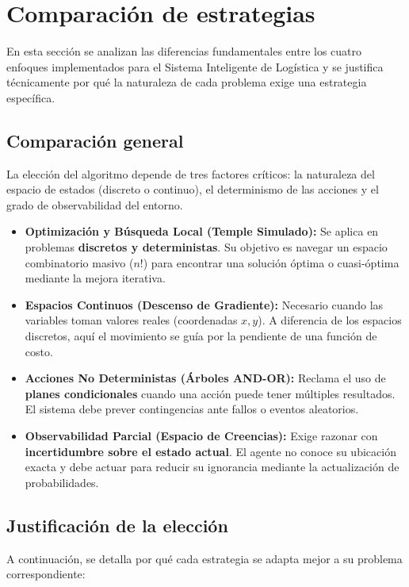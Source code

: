 \section{Comparación de estrategias}

En esta sección se analizan las diferencias fundamentales entre los cuatro enfoques implementados para el Sistema Inteligente de Logística y se justifica técnicamente por qué la naturaleza de cada problema exige una estrategia específica.

\subsection{Comparación general}

La elección del algoritmo depende de tres factores críticos: la naturaleza del espacio de estados (discreto o continuo), el determinismo de las acciones y el grado de observabilidad del entorno.

\begin{itemize}
    \item \textbf{Optimización y Búsqueda Local (Temple Simulado):} Se aplica en problemas \textbf{discretos y deterministas}. Su objetivo es navegar un espacio combinatorio masivo ($n!$) para encontrar una solución óptima o cuasi-óptima mediante la mejora iterativa.
    \item \textbf{Espacios Continuos (Descenso de Gradiente):} Necesario cuando las variables toman valores reales (coordenadas $x, y$). A diferencia de los espacios discretos, aquí el movimiento se guía por la pendiente de una función de costo.
    \item \textbf{Acciones No Deterministas (Árboles AND-OR):} Reclama el uso de \textbf{planes condicionales} cuando una acción puede tener múltiples resultados. El sistema debe prever contingencias ante fallos o eventos aleatorios.
    \item \textbf{Observabilidad Parcial (Espacio de Creencias):} Exige razonar con \textbf{incertidumbre sobre el estado actual}. El agente no conoce su ubicación exacta y debe actuar para reducir su ignorancia mediante la actualización de probabilidades.
\end{itemize}

\subsection{Justificación de la elección}

A continuación, se detalla por qué cada estrategia se adapta mejor a su problema correspondiente:

